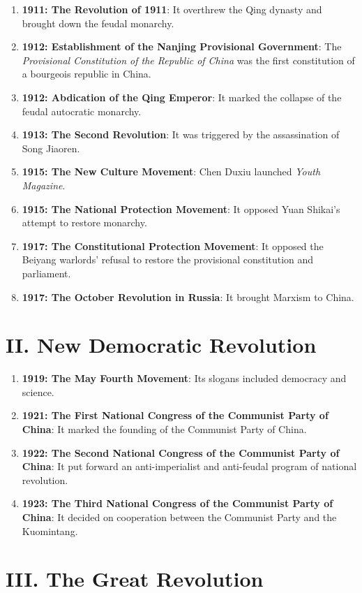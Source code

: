 \documentclass[12pt,a4paper]{ctexart}
\begin{document}
\begin{enumerate}[leftmargin=2em]
    \item \textbf{1911: The Revolution of 1911}: It overthrew the Qing dynasty and brought down the feudal monarchy.
    \item \textbf{1912: Establishment of the Nanjing Provisional Government}: The \textit{Provisional Constitution of the Republic of China} was the first constitution of a bourgeois republic in China.
    \item \textbf{1912: Abdication of the Qing Emperor}: It marked the collapse of the feudal autocratic monarchy.
    \item \textbf{1913: The Second Revolution}: It was triggered by the assassination of Song Jiaoren.
    \item \textbf{1915: The New Culture Movement}: Chen Duxiu launched \textit{Youth Magazine}.
    \item \textbf{1915: The National Protection Movement}: It opposed Yuan Shikai's attempt to restore monarchy.
    \item \textbf{1917: The Constitutional Protection Movement}: It opposed the Beiyang warlords' refusal to restore the provisional constitution and parliament.
    \item \textbf{1917: The October Revolution in Russia}: It brought Marxism to China.
\end{enumerate}

\section{II. New Democratic Revolution}

\begin{enumerate}[leftmargin=2em]
    \item \textbf{1919: The May Fourth Movement}: Its slogans included democracy and science.
    \item \textbf{1921: The First National Congress of the Communist Party of China}: It marked the founding of the Communist Party of China.
    \item \textbf{1922: The Second National Congress of the Communist Party of China}: It put forward an anti-imperialist and anti-feudal program of national revolution.
    \item \textbf{1923: The Third National Congress of the Communist Party of China}: It decided on cooperation between the Communist Party and the Kuomintang.
\end{enumerate}

\section{III. The Great Revolution}
\end{document}
